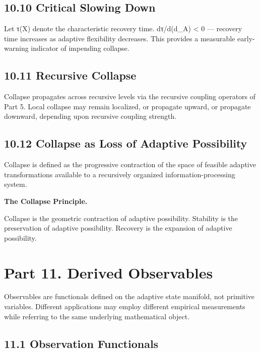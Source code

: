 \documentclass[
]{article}
\begin{document}
\hypertarget{critical-slowing-down}{%
\subsection{10.10 Critical Slowing Down}\label{critical-slowing-down}}

Let τ(X) denote the characteristic recovery time. dτ/d(d\_A) \textless{}
0 --- recovery time increases as adaptive flexibility decreases. This
provides a measurable early-warning indicator of impending collapse.

\hypertarget{recursive-collapse}{%
\subsection{10.11 Recursive Collapse}\label{recursive-collapse}}

Collapse propagates across recursive levels via the recursive coupling
operators of Part 5. Local collapse may remain localized, or propagate
upward, or propagate downward, depending upon recursive coupling
strength.

\hypertarget{collapse-as-loss-of-adaptive-possibility}{%
\subsection{10.12 Collapse as Loss of Adaptive
Possibility}\label{collapse-as-loss-of-adaptive-possibility}}

Collapse is defined as the progressive contraction of the space of
feasible adaptive transformations available to a recursively organized
information-processing system.

\textbf{The Collapse Principle.}

Collapse is the geometric contraction of adaptive possibility. Stability
is the preservation of adaptive possibility. Recovery is the expansion
of adaptive possibility.

\hypertarget{part-11.-derived-observables}{%
\section{Part 11. Derived
Observables}\label{part-11.-derived-observables}}

Observables are functionals defined on the adaptive state manifold, not
primitive variables. Different applications may employ different
empirical measurements while referring to the same underlying
mathematical object.

\hypertarget{observation-functionals}{%
\subsection{11.1 Observation
Functionals}\label{observation-functionals}}
\end{document}
